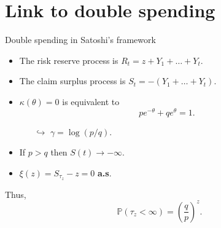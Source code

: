 \documentclass{beamer}
\begin{document}
\section{Link to double spending}
\begin{frame}{Double spending in Satoshi's framework}
\scriptsize
\begin{itemize}
\item The risk reserve process is $R_t=z+Y_1+\ldots+Y_t.$
\item The claim surplus process is $S_t=-(Y_1+\ldots+Y_t).$
\item $\kappa(\theta)=0$ is equivalent to
$$pe^{-\theta}+qe^{\theta}=1.$$
\begin{itemize}
\item[$\hookrightarrow$]\scriptsize $\gamma=\log(p/q).$
\end{itemize}
\item If $p>q$ then $S(t)\rightarrow - \infty$.
\item  $\xi(z)=S_{\tau_z}-z=0$ \textbf{a.s}.
\end{itemize}
Thus,
$$\mathbb{P}(\tau_z<\infty)=\left(\frac{q}{p}\right)^{z}.$$
\end{frame}
\end{document}
